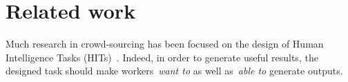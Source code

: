 \section{Related work}
\label{sec:rel}

Much research in crowd-sourcing has been focused on the design of Human Intelligence 
Tasks (HITs)~\cite{ahnl:04, anhl06:impr, ahnl06:peekaboom, eickhoff12:qual, Kazai09onthe, Kazai11crowd}. 
Indeed, in order to generate useful results, the designed task should
make workers~\emph{want to} as well as~\emph{able to} generate outputs.

